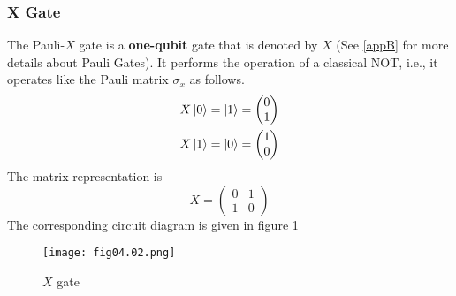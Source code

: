\subsubsection*{X Gate}
The Pauli-$X$ gate is a \textbf{one-qubit} gate that is denoted by $X$ (See \ref{appB} for more details about Pauli Gates). It performs the operation of a classical NOT, i.e., it operates like the Pauli matrix $\sigma_x$ as follows. 
\begin{equation*}
\begin{split}
X\left\vert 0\right\rangle&=\left\vert 1\right\rangle=
\begin{pmatrix}
0\\
1
\end{pmatrix}\\
X\left\vert 1\right\rangle&=\left\vert 0\right\rangle=
\begin{pmatrix}
1\\
0
\end{pmatrix}\\
\end{split}
\end{equation*}
The matrix representation is
\begin{equation*}
X=
\begin{pmatrix}
0&1\\
1&0
\end{pmatrix}
\end{equation*}
The corresponding circuit diagram is given in figure \ref{Fig:4.2}
\begin{figure}[!htb]
   \begin{minipage}{\textwidth}
     \centering
     \texttt{[image: fig04.02.png]}
     \caption{$X$ gate}
     \label{Fig:4.2}
   \end{minipage}
\end{figure}


